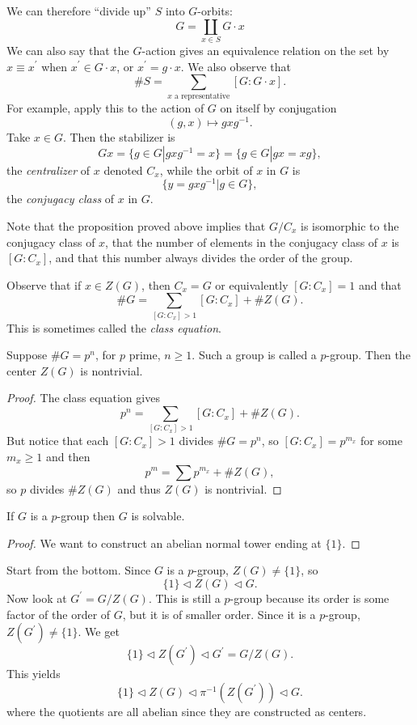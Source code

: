 \documentclass{article}
\begin{document}
We can therefore ``divide up'' $S$ into $G$-orbits:
$$
G = \coprod_{x \in S} G \cdot x
$$
We can also say that the $G$-action gives an equivalence relation on
the set by $x \equiv x^\prime$ when $x^\prime \in G \cdot x$, or
$x^\prime = g \cdot x$. We also observe that
$$
\# S = \sum_{x \text{ a representative}} [G : G \cdot x].
$$
For example, apply this to the action of $G$ on itself by conjugation
$$
(g, x) \mapsto g x g^{-1}.
$$
Take $x \in G$. Then the stabilizer is
$$
G x = \{ g \in G | gxg^{-1} = x \}
    = \{ g \in G | gx = xg \},
$$
the \emph{centralizer} of $x$ denoted $C_x$, while the orbit of $x$ in $G$ is
$$
\{ y = gxg^{-1} | g \in G \},
$$
the \emph{conjugacy class} of $x$ in $G$.

Note that the proposition proved above implies that $G / C_x$ is
isomorphic to the conjugacy class of $x$, that the number of elements
in the conjugacy class of $x$ is $[G : C_x]$, and that this number
always divides the order of the group. 

Observe that if $x \in Z(G)$, then $C_x = G$ or equivalently 
$[G : C_x] = 1$ and that
$$
\# G = \sum_{[G : C_x] > 1} [G : C_x] + \# Z(G).
$$
This is sometimes called the \emph{class equation}.

\begin{corol}
Suppose $\# G = p^n$, for $p$ prime, $n \geq 1$. Such a group is called a
$p$-group. Then the center $Z(G)$ is nontrivial.
\end{corol}

\begin{proof}
The class equation gives
$$
p^n = \sum_{[G : C_x] > 1} [G : C_x] + \# Z(G).
$$
But notice that each $[G : C_x] > 1$ divides
$\# G = p^n$, so $[G : C_x] = p^{m_x}$ for some $m_x \geq 1$
and then
$$
p^m = \sum p^{m_x} + \# Z(G),
$$
so $p$ divides $\# Z(G)$ and thus $Z(G)$ is nontrivial.
\end{proof}

\begin{corol}
If $G$ is a $p$-group then $G$ is solvable.
\end{corol}
\begin{proof}
We want to construct an abelian normal tower ending at $\{ 1 \}$.
\end{proof}
Start from the bottom. Since $G$ is a $p$-group, $Z(G) \neq \{1\}$, so
$$
\{1\} \triangleleft Z(G) \triangleleft G.
$$
Now look at $G^\prime = G / Z(G)$. This is still a $p$-group because
its order is some factor of the order of $G$, but it is of smaller
order. Since it is a $p$-group, $Z(G^\prime) \neq \{1\}$. We get
$$
\{ 1 \} \triangleleft Z(G^\prime) \triangleleft G^\prime = G / Z(G).
$$
This yields
$$
\{1\} 
  \triangleleft Z(G)
  \triangleleft \pi^{-1}(Z(G^\prime))
  \triangleleft G.
$$
where the quotients are all abelian since they are constructed as
centers.
\end{document}
